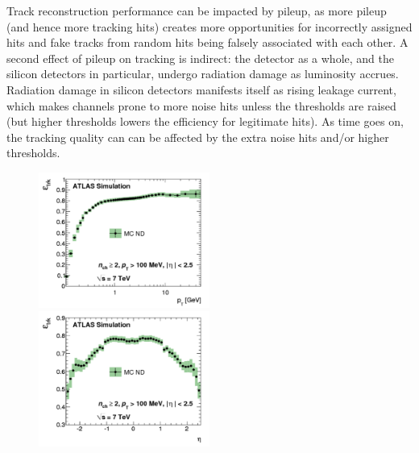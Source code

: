 Track reconstruction performance can be impacted by pileup, as more pileup (and hence more tracking hits) creates more opportunities for incorrectly assigned hits and fake tracks from random hits being falsely associated with each other.  A second effect of pileup on tracking is indirect: the detector as a whole, and the silicon detectors in particular, undergo radiation damage as luminosity accrues.  Radiation damage in silicon detectors manifests itself as rising leakage current, which makes channels prone to more noise hits unless the thresholds are raised (but higher thresholds lowers the efficiency for legitimate hits).  As time goes on, the tracking quality can can be affected by the extra noise hits and/or higher thresholds.

\begin{figure}
	\includegraphics[width=0.5\textwidth]{ReconstructionPerformance/images/track_perf1.pdf}
	\includegraphics[width=0.5\textwidth]{ReconstructionPerformance/images/track_perf2.pdf}
	\label{fig:track_perfA}  
	\caption{}
\end{figure}



